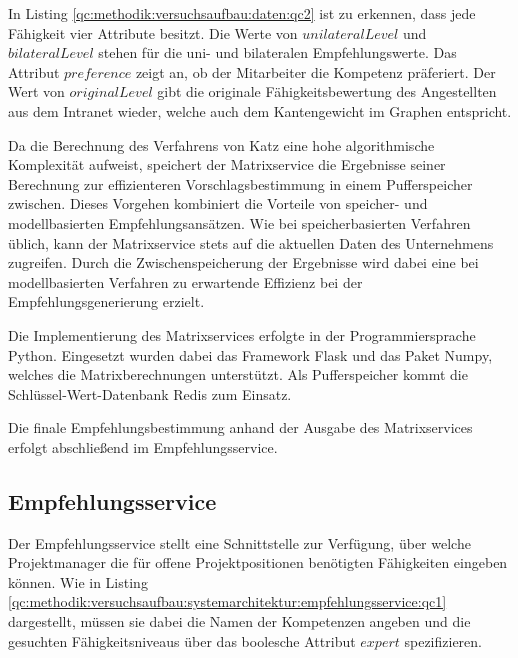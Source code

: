 In Listing \ref{qc:methodik:versuchsaufbau:daten:qc2} ist zu erkennen, dass jede Fähigkeit vier Attribute besitzt. Die Werte von $unilateralLevel$ und $bilateralLevel$ stehen für die uni- und bilateralen Empfehlungswerte. Das Attribut $preference$ zeigt an, ob der Mitarbeiter die Kompetenz präferiert. Der Wert von $originalLevel$ gibt die originale Fähigkeitsbewertung des Angestellten aus dem Intranet wieder, welche auch dem Kantengewicht im Graphen entspricht.

Da die Berechnung des Verfahrens von Katz eine hohe algorithmische Komplexität aufweist, speichert der Matrixservice die Ergebnisse seiner Berechnung zur effizienteren Vorschlagsbestimmung in einem Pufferspeicher zwischen. Dieses Vorgehen kombiniert die Vorteile von speicher- und modellbasierten Empfehlungsansätzen. Wie bei speicherbasierten Verfahren üblich, kann der Matrixservice stets auf die aktuellen Daten des Unternehmens zugreifen. Durch die Zwischenspeicherung der Ergebnisse wird dabei eine bei modellbasierten Verfahren zu erwartende Effizienz bei der Empfehlungsgenerierung erzielt.

Die Implementierung des Matrixservices erfolgte in der Programmiersprache Python. Eingesetzt wurden dabei das Framework Flask und das Paket Numpy, welches die Matrixberechnungen unterstützt. Als Pufferspeicher kommt die Schlüssel-Wert-Datenbank Redis zum Einsatz.

Die finale Empfehlungsbestimmung anhand der Ausgabe des Matrixservices erfolgt abschließend im Empfehlungsservice.

\subsection{Empfehlungsservice}
\label{ch:methodik:versuchsaufbau:systemarchitektur:empfehlungsservice}
Der Empfehlungsservice stellt eine Schnittstelle zur Verfügung, über welche Projektmanager die für offene Projektpositionen benötigten Fähigkeiten eingeben können. Wie in Listing \ref{qc:methodik:versuchsaufbau:systemarchitektur:empfehlungsservice:qc1} dargestellt, müssen sie dabei die Namen der Kompetenzen angeben und die gesuchten Fähigkeitsniveaus über das boolesche Attribut $expert$ spezifizieren.



